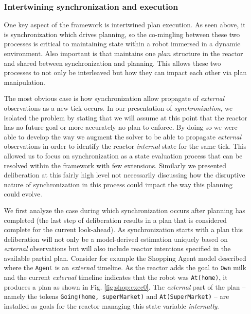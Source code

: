 \subsubsection{Intertwining synchronization and execution}
\label{sec:arch:intertwine}

One key aspect of the \rx framework is intertwined plan execution. As
seen above, it is synchronization which drives planning, so the
co-mingling between these two processes is critical to maintaining
state within a robot immersed in a dynamic environment. Also important
is that \rx maintains 
one $plan$ structure in the reactor and shared between synchronization
and planning. This allows these two processes to not only be
interleaved but how they can impact each other via plan manipulation.

The most obvious case is how synchronization allow propagate of {\em
  external} observations as a new tick occurs. In our presentation of 
{\em synchronization}, we isolated the problem by stating
that we will assume at this point that the reactor has no future goal
or more accurately no plan to enforce. By doing so we
were able to develop the way we augment the \eu solver to be able
to propagate {\em external} observations in order to identify the
reactor {\em internal} state for the same tick. This allowed us 
to focus on synchronization as a state evaluation process that can
be resolved within the \eu framework with few extensions. Similarly
we presented deliberation at this fairly high level not necessarily
discussing how the disruptive nature of synchronization in this
process could impact the way this planning could evolve.

We first analyze the case during which synchronization occurs after
planning has completed (\ie the last step of deliberation results in a
plan that is considered complete for the current look-ahead). As
synchronization starts with a plan %
this deliberation will not only be a model-derived estimation uniquely
based on {\em external} observations but will also include reactor
intentions specified in the available partial plan. Consider for
example the Shopping Agent model described where the \texttt{Agent} is
an {\em external} timeline. As the reactor adds the goal to
\texttt{Own} milk and the current {\em external} timeline indicates
that the robot was \texttt{At(home)}, it produces a plan as shown in
Fig. \ref{fig:shop:exec0}. The {\em external} part of the plan --
namely the tokens \texttt{Going(home, superMarket)} and
\texttt{At(SuperMarket)} -- are installed as goals for the reactor
managing this state variable {\em internally}.

